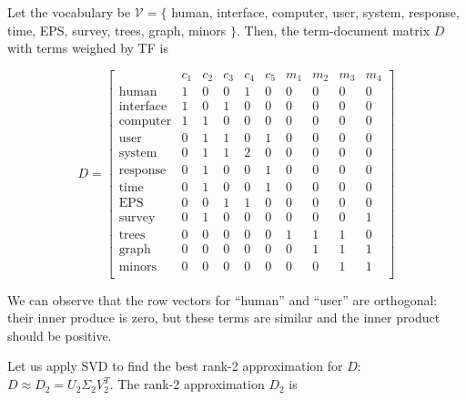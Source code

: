 Let the vocabulary be $\mathcal V = \{$ human, interface, computer, user, system, response, time, EPS, survey, trees, graph, minors $\}$. Then, the term-document matrix $D$
with terms weighed by TF is 

$$D =
\left[\begin{array}{c|ccccccccc}
 & c_1 & c_2 & c_3 & c_4 & c_5 & m_1 & m_2 & m_3 & m_4 \\
\hline
\text{human} & 1 & 0 & 0 & 1 & 0 & 0 & 0 & 0 & 0 \\
\text{interface} & 1 & 0 & 1 & 0 & 0 & 0 & 0 & 0 & 0 \\
\text{computer} & 1 & 1 & 0 & 0 & 0 & 0 & 0 & 0 & 0 \\
\text{user} & 0 & 1 & 1 & 0 & 1 & 0 & 0 & 0 & 0 \\
\text{system} & 0 & 1 & 1 & 2 & 0 & 0 & 0 & 0 & 0 \\
\text{response} & 0 & 1 & 0 & 0 & 1 & 0 & 0 & 0 & 0 \\
\text{time} & 0 & 1 & 0 & 0 & 1 & 0 & 0 & 0 & 0 \\
\text{EPS} & 0 & 0 & 1 & 1 & 0 & 0 & 0 & 0 & 0 \\
\text{survey} & 0 & 1 & 0 & 0 & 0 & 0 & 0 & 0 & 1 \\
\text{trees} & 0 & 0 & 0 & 0 & 0 & 1 & 1 & 1 & 0 \\
\text{graph} & 0 & 0 & 0 & 0 & 0 & 0 & 1 & 1 & 1 \\
\text{minors} & 0 & 0 & 0 & 0 & 0 & 0 & 0 & 1 & 1 \\
\end{array} \right] $$


We can observe that the row vectors for ``human'' and  ``user'' are 
orthogonal: their inner produce is zero, but these terms are similar 
and the inner product should be positive. 

Let us apply SVD to find the best rank-2 approximation for $D$: 
$D \approx D_2 = U_2 \Sigma_2 V_2^T$. The rank-2 approximation $D_2$
is 

